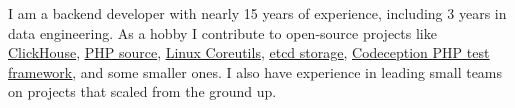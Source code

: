 I am a backend developer with nearly 15 years of experience, including 3 years
in data engineering. As a hobby I contribute to open-source projects like
\href{https://github.com/ClickHouse/ClickHouse/pulls?q=is\%3Apr+is\%3Aclosed+author\%3AGSokol}{\underline{ClickHouse}},
\href{https://github.com/php/php-src/pulls?q=is\%3Apr+is\%3Aclosed+author\%3AGSokol}{\underline{PHP source}},
\href{https://github.com/coreutils/coreutils/commits?author=GSokol}{\underline{Linux Coreutils}},
\href{https://github.com/etcd-io/etcd/pulls?q=is\%3Apr+is\%3Aclosed+author\%3AGSokol}{\underline{etcd storage}},
\href{https://github.com/Codeception/Codeception/pulls?q=is\%3Apr+is\%3Aclosed+author\%3AGSokol}{\underline{Codeception PHP test framework}},
and some smaller ones. I also have experience in leading small teams on
projects that scaled from the ground up.

